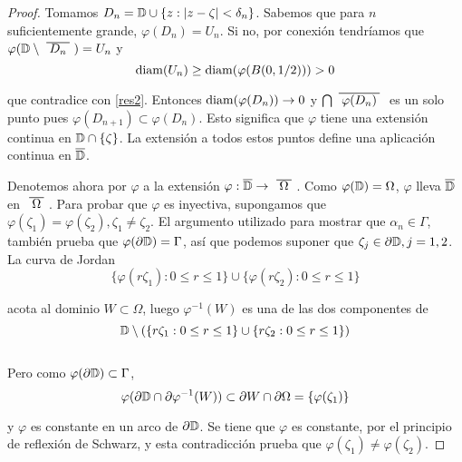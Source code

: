 \begin{proof}
    Tomamos $D_n = \mathbb{D} \cup \{ z: \left\lvert z - \zeta\right\rvert < \delta_n \}$. Sabemos que para $n$ suficientemente grande, $\varphi(D_n) = U_n$. Si no, por conexión tendríamos que $\varphi(\disk \setminus \xbar{D_n}) = U_n$ y
    \begin{equation*}
        \operatorname{diam} (U_n) \geq \operatorname{diam} (\varphi(B(0, 1/2))) > 0
    \end{equation*}

    que contradice con \ref{res2}. Entonces $\operatorname{diam}(\varphi(D_n)) \rightarrow 0$ y $\bigcap \xbar{\varphi(D_n)}$ es un solo punto pues $\varphi(D_{n+1}) \subset \varphi(D_n)$. Esto significa que $\varphi$ tiene una extensión continua en $\mathbb{D} \cap \{ \zeta \}$. La extensión a todos estos puntos define una aplicación continua en $\overline{\mathbb{D}}$.

    Denotemos ahora por $\varphi$ a la extensión $\varphi : \closedisk \rightarrow \xbar{\Omega}$. Como $\varphi(\mathbb{D}) = \Omega$, $\varphi$ lleva  $\overline{\mathbb{D}}$ en $\xbar{\Omega}$. Para probar que $\varphi$ es inyectiva, supongamos que $\varphi(\zeta_1) = \varphi(\zeta_2), \zeta_1 \not = \zeta_2$. El argumento utilizado para mostrar que $\alpha_n \in \Gamma$, también prueba que $\varphi (\partial \mathbb{D}) = \Gamma$, así que podemos suponer que $\zeta_j \in \partial \mathbb{D}, j=1,2$. La curva de Jordan
    \begin{equation*}
        \{\varphi (r \zeta_1) : 0 \leq r \leq 1\} \cup \{\varphi (r \zeta_2) : 0 \leq r \leq 1\}
    \end{equation*}

    acota al dominio $W \subset \Omega$, luego $\varphi ^{-1} (W)$ es una de las dos componentes de
    \begin{equation*}
        \mathbb{D} \setminus ( \{ r \zeta_1 : 0 \leq r \leq 1\} \cup \{ r \zeta_2 : 0 \leq r \leq 1\})
    \end{equation*}
    \\
    Pero como $\varphi(\partial \mathbb{D}) \subset \Gamma$,
    \begin{equation*}
        \varphi(\partial \mathbb{D} \cap \partial \varphi ^{-1} (W)) \subset \partial W \cap \partial \Omega = \{ \varphi (\zeta_1)\}
    \end{equation*}

    y $\varphi$ es constante en un arco de $\partial \mathbb{D}$. Se tiene que $\varphi$ es constante, por el principio de reflexión de Schwarz, y esta contradicción prueba que $\varphi(\zeta_1) \not = \varphi(\zeta_2)$.
\end{proof}

